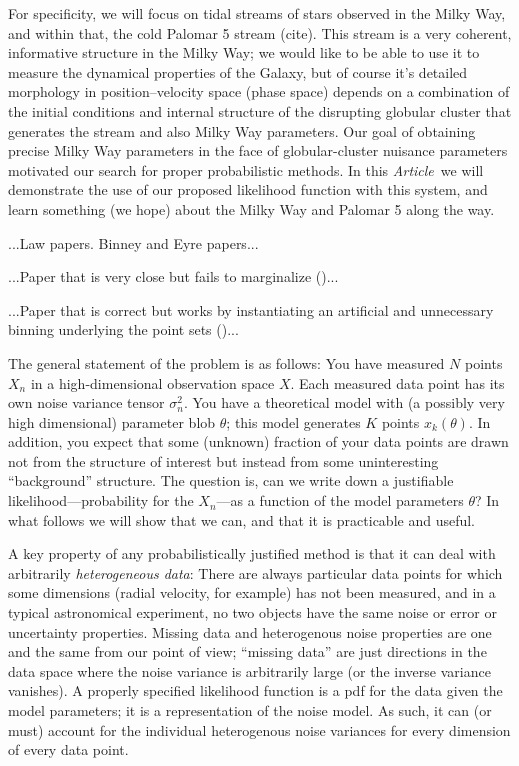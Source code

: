 \documentclass[12pt,pdftex,preprint]{aastex}
\newcommand{\documentname}{\textsl{Article}}
\begin{document}
For specificity, we will focus on tidal streams of stars observed in
the Milky Way, and within that, the cold Palomar 5 stream (cite).
This stream is a very coherent, informative structure in the Milky
Way; we would like to be able to use it to measure the dynamical
properties of the Galaxy, but of course it's detailed morphology in
position--velocity space (phase space) depends on a combination of the
initial conditions and internal structure of the disrupting globular
cluster that generates the stream and also Milky Way parameters.  Our
goal of obtaining precise Milky Way parameters in the face of
globular-cluster nuisance parameters motivated our search for proper
probabilistic methods.  In this \documentname\ we will demonstrate the
use of our proposed likelihood function with this system, and learn
something (we hope) about the Milky Way and Palomar 5 along the way.

...Law papers.  Binney and Eyre papers...

...Paper that is very close but fails to marginalize
(\citealt{varghese})...

...Paper that is correct but works by instantiating an artificial and
unnecessary binning underlying the point sets (\citealt{saha})...

The general statement of the problem is as follows: You have measured
$N$ points $X_n$ in a high-dimensional observation space $X$.  Each
measured data point has its own noise variance tensor $\sigma^2_n$.
You have a theoretical model with (a possibly very high dimensional)
parameter blob $\theta$; this model generates $K$ points
$x_k(\theta)$.  In addition, you expect that some (unknown) fraction
of your data points are drawn not from the structure of interest but
instead from some uninteresting ``background'' structure.  The
question is, can we write down a justifiable likelihood---probability
for the $X_n$---as a function of the model parameters $\theta$?  In
what follows we will show that we can, and that it is practicable and
useful.

A key property of any probabilistically justified method is that it
can deal with arbitrarily \emph{heterogeneous data}:
There are always particular data points for which some dimensions
(radial velocity, for example) has not been measured, and in a typical
astronomical experiment, no two objects have the same noise or error
or uncertainty properties.
Missing data and heterogenous noise properties are one and the same
from our point of view; ``missing data'' are just directions in the
data space where the noise variance is arbitrarily large (or the
inverse variance vanishes).
A properly specified likelihood function is a pdf for the data given
the model parameters; it is a representation of the noise model.
As such, it can (or must) account for the individual heterogenous
noise variances for every dimension of every data point.
\end{document}
